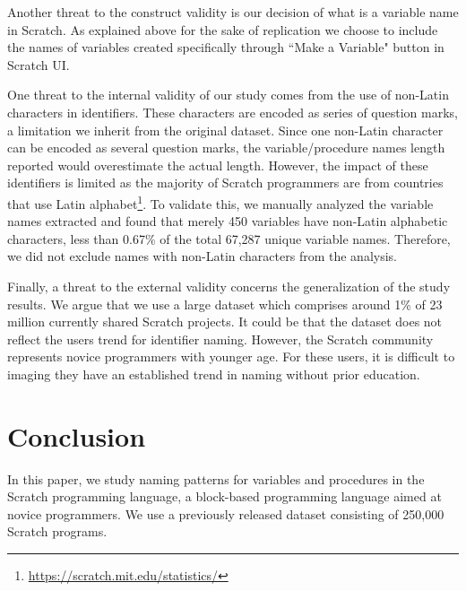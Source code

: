 \documentclass[conference]{IEEEtran}
\begin{document}
Another threat to the construct validity is our decision of what is a variable name in Scratch. As explained above for the sake of replication we choose to include the names of variables created specifically through ``Make a Variable" button in Scratch UI. 

One threat to the internal validity of our study comes from the use of non-Latin characters in identifiers. These characters are encoded as series of question marks, a limitation we inherit from the original dataset. Since one non-Latin character can be encoded as several question marks, the variable/procedure names length reported would overestimate the actual length. However, the impact of these identifiers is limited as the majority of Scratch programmers are from countries that use Latin alphabet\footnote{\url{https://scratch.mit.edu/statistics/}}. To validate this, we manually analyzed the variable names extracted and found that merely 450 variables have non-Latin alphabetic characters, less than 0.67\% of the total 67,287 unique variable names. Therefore, we did not exclude names with non-Latin characters from the analysis.

Finally, a threat to the external validity concerns the generalization of the study results. We argue that we use a large dataset which comprises around 1\% of 23 million currently shared Scratch projects. It could be that the dataset does not reflect the users trend for identifier naming. However, the Scratch community represents novice programmers with younger age. For these users, it is difficult to imaging they have an established trend in naming without prior education.

\section{Conclusion}
In this paper, we study naming patterns for variables and procedures in the Scratch programming language, a block-based programming language aimed at novice programmers. We use a previously released dataset consisting of 250,000 Scratch programs. 
\end{document}
